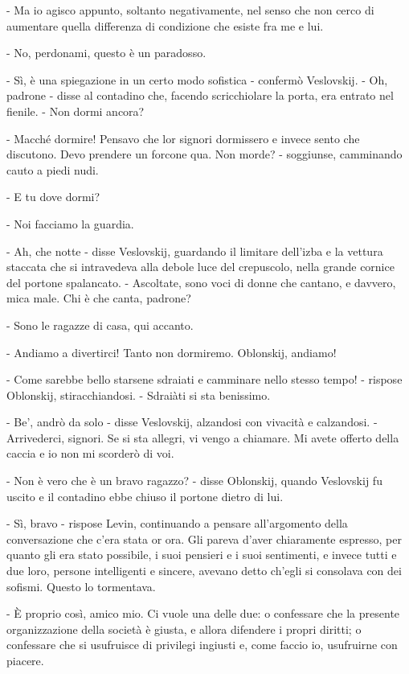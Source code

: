 - Ma io agisco appunto, soltanto negativamente, nel senso che non cerco di aumentare quella differenza di condizione che esiste fra me e lui. 

- No, perdonami, questo è un paradosso. 

- Sì, è una spiegazione in un certo modo sofistica - confermò Veslovskij. - Oh, padrone - disse al contadino che, facendo scricchiolare la porta, era entrato nel fienile. - Non dormi ancora? 

- Macché dormire! Pensavo che lor signori dormissero e invece sento che discutono. Devo prendere un forcone qua. Non morde? - soggiunse, camminando cauto a piedi nudi. 

- E tu dove dormi? 

- Noi facciamo la guardia. 

- Ah, che notte - disse Veslovskij, guardando il limitare dell'izba e la vettura staccata che si intravedeva alla debole luce del crepuscolo, nella grande cornice del portone spalancato. - Ascoltate, sono voci di donne che cantano, e davvero, mica male. Chi è che canta, padrone? 

- Sono le ragazze di casa, qui accanto. 

- Andiamo a divertirci! Tanto non dormiremo. Oblonskij, andiamo! 

- Come sarebbe bello starsene sdraiati e camminare nello stesso tempo! - rispose Oblonskij, stiracchiandosi. - Sdraiàti si sta benissimo. 

- Be', andrò da solo - disse Veslovskij, alzandosi con vivacità e calzandosi. - Arrivederci, signori. Se si sta allegri, vi vengo a chiamare. Mi avete offerto della caccia e io non mi scorderò di voi. 

- Non è vero che è un bravo ragazzo? - disse Oblonskij, quando Veslovskij fu uscito e il contadino ebbe chiuso il portone dietro di lui. 

- Sì, bravo - rispose Levin, continuando a pensare all'argomento della conversazione che c'era stata or ora. Gli pareva d'aver chiaramente espresso, per quanto gli era stato possibile, i suoi pensieri e i suoi sentimenti, e invece tutti e due loro, persone intelligenti e sincere, avevano detto ch'egli si consolava con dei sofismi. Questo lo tormentava. 

- È proprio così, amico mio. Ci vuole una delle due: o confessare che la presente organizzazione della società è giusta, e allora difendere i propri diritti; o confessare che si usufruisce di privilegi ingiusti e, come faccio io, usufruirne con piacere. 

